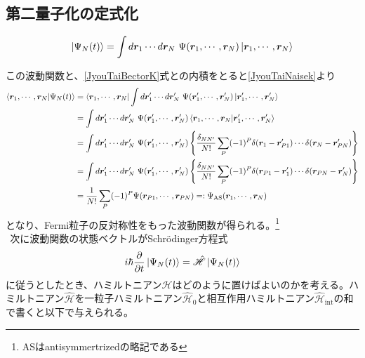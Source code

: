 \documentclass[dvipdfmx, 11pt, a4paper]{jsarticle}
\theoremstyle{definition}
\numberwithin{equation}{section}
\begin{document}
\subsection{第二量子化の定式化}
    \begin{definition}[波動関数の状態ベクトル]
        \begin{equation}
            \ket{\Psi_N(t)} = \int d\bm{r}_1\cdots d\bm{r}_N\ \Psi(\bm{r}_1,\cdots,\bm{r}_N) \ket{\bm{r}_1, \cdots ,\bm{r}_N}
        \end{equation}
    \end{definition}
    この波動関数と、\eqref{JyouTaiBectorK}式との内積をとると\eqref{JyouTaiNaisek}より
    \begin{align}
        \braket{\bm{r}_1,\cdots ,\bm{r}_N| \Psi_N(t)} &= \bra{\bm{r}_1,\cdots ,\bm{r}_N} \int d\bm{r}'_1\cdots d\bm{r}'_N\ \Psi(\bm{r}'_1,\cdots,\bm{r}'_N) \ket{\bm{r}'_1, \cdots ,\bm{r}'_N} \notag \\
        &= \int d\bm{r}'_1\cdots d\bm{r}'_N\ \Psi(\bm{r}'_1,\cdots,\bm{r}'_N)  \braket{\bm{r}_1,\cdots ,\bm{r}_N|\bm{r}'_1, \cdots ,\bm{r}'_N} \notag \\
        &= \int d\bm{r}'_1\cdots d\bm{r}'_N\ \Psi(\bm{r}'_1,\cdots,\bm{r}'_N) \left\{ \frac{\delta_{NN'}}{N!}\sum_P (-1)^P \delta(\bm{r}_1-\bm{r}'_{P1})\cdots\delta(\bm{r}_N-\bm{r}'_{PN}) \right\} \notag \\
        &= \int d\bm{r}'_1\cdots d\bm{r}'_N\ \Psi(\bm{r}'_1,\cdots,\bm{r}'_N) \left\{ \frac{\delta_{NN'}}{N!}\sum_P (-1)^P \delta(\bm{r}_{P1}-\bm{r}'_1)\cdots\delta(\bm{r}_{PN}-\bm{r}'_N) \right\} \notag \\
        &=\frac{1}{N!} \sum_{P} (-1)^P \Psi(\bm{r}_{P1},\cdots,\bm{r}_{PN}) =: \Psi_{\textrm{AS}}(\bm{r}_1,\cdots,\bm{r}_N)
    \end{align}
    となり、Fermi粒子の反対称性をもった波動関数が得られる。\footnote{ASはantisymmertrizedの略記である}\\
    $\ \ $次に波動関数の状態ベクトルがSchrödinger方程式
    \begin{align}
        i\hbar \frac{\partial}{\partial t}\ket{\Psi_N(t)} = \hat{\mathscr{H}} \ket{\Psi_N(t)} \label{JyouTaiSyureding}
    \end{align}
    に従うとしたとき、ハミルトニアン$\mathscr{H}$はどのように置けばよいのかを考える。ハミルトニアン$\hat{\mathscr{H}}$を一粒子ハミルトニアン$\hat{\mathscr{H}}_0$と相互作用ハミルトニアン$\hat{\mathscr{H}}_{\text{int}}$の和で書くと以下で与えられる。
\end{document}
